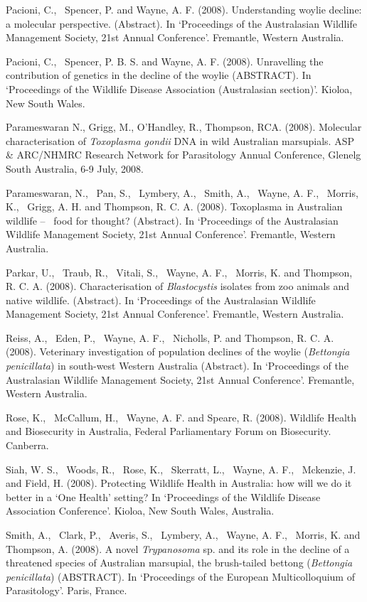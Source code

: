 \documentclass[version=last,
    paper=a4,                               %
    10pt,                                   %
    dvipsnames,
    oneside,                              %
    headings=openany,                       %
    open=any,
    BCOR=7mm,                               %
    DIV=15,     %
]{scrbook}
\begin{document}
Pacioni, C.,~ Spencer, P. and Wayne, A. F. (2008). Understanding woylie
decline: a molecular perspective. (Abstract). In `Proceedings of the
Australasian Wildlife Management Society, 21st Annual Conference'.
Fremantle, Western Australia.

Pacioni, C.,~ Spencer, P. B. S. and Wayne, A. F. (2008). Unravelling the
contribution of genetics in the decline of the woylie (ABSTRACT). In
`Proceedings of the Wildlife Disease Association (Australasian
section)'. Kioloa, New South Wales.

Parameswaran N., Grigg, M., O'Handley, R., Thompson, RCA. (2008).
Molecular characterisation of \emph{Toxoplasma gondii} DNA in wild
Australian marsupials. ASP \& ARC/NHMRC Research Network for
Parasitology Annual Conference, Glenelg South Australia, 6-9 July, 2008.

Parameswaran, N.,~ Pan, S.,~ Lymbery, A.,~ Smith, A.,~ Wayne, A. F.,~
Morris, K.,~ Grigg, A. H. and Thompson, R. C. A. (2008). Toxoplasma in
Australian wildlife --~ food for thought? (Abstract). In `Proceedings of
the Australasian Wildlife Management Society, 21st Annual Conference'.
Fremantle, Western Australia.

Parkar, U.,~ Traub, R.,~ Vitali, S.,~ Wayne, A. F.,~ Morris, K. and
Thompson, R. C. A. (2008). Characterisation of \emph{Blastocystis}
isolates from zoo animals and native wildlife. (Abstract). In
`Proceedings of the Australasian Wildlife Management Society, 21st
Annual Conference'. Fremantle, Western Australia.

Reiss, A.,~ Eden, P.,~ Wayne, A. F.,~ Nicholls, P. and Thompson, R. C.
A. (2008). Veterinary investigation of population declines of the woylie
(\emph{Bettongia penicillata}) in south-west Western Australia
(Abstract). In `Proceedings of the Australasian Wildlife Management
Society, 21st Annual Conference'. Fremantle, Western Australia.

Rose, K.,~ McCallum, H.,~ Wayne, A. F. and Speare, R. (2008). Wildlife
Health and Biosecurity in Australia, Federal Parliamentary Forum on
Biosecurity. Canberra.

Siah, W. S.,~ Woods, R.,~ Rose, K.,~ Skerratt, L.,~ Wayne, A. F.,~
Mckenzie, J. and Field, H. (2008). Protecting Wildlife Health in
Australia: how will we do it better in a `One Health' setting? In
`Proceedings of the Wildlife Disease Association Conference'. Kioloa,
New South Wales, Australia.

Smith, A.,~ Clark, P.,~ Averis, S.,~ Lymbery, A.,~ Wayne, A. F.,~
Morris, K. and Thompson, A. (2008). A novel \emph{Trypanosoma} sp. and
its role in the decline of a threatened species of Australian marsupial,
the brush-tailed bettong (\emph{Bettongia penicillata}) (ABSTRACT). In
`Proceedings of the European Multicolloquium of Parasitology'. Paris,
France.
\end{document}
